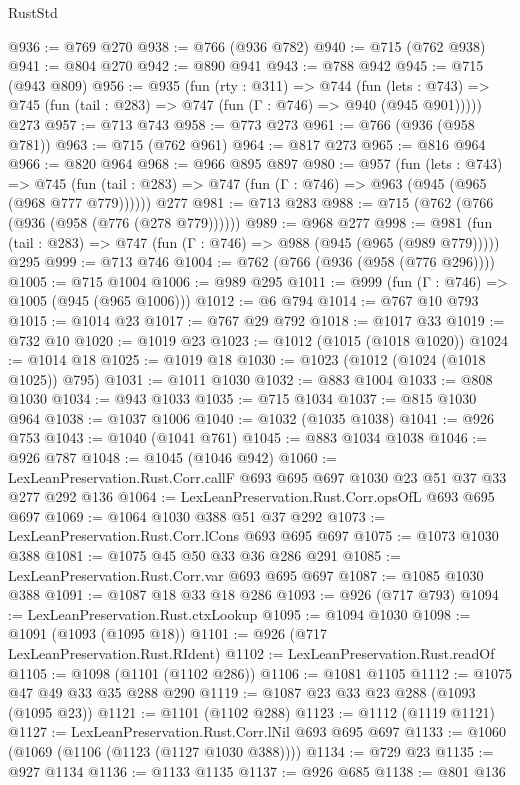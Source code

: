 \begin{lexlean}{RustStd}
\begin{coremodule}
{\begin{coremodule}
{{{{{{{{@936 := @769 @270
@938 := @766 (@936 @782)
@940 := @715 (@762 @938)
@941 := @804 @270
@942 := @890 @941
@943 := @788 @942
@945 := @715 (@943 @809)
@956 := @935
    (fun (rty : @311) =>
    @744
      (fun (lets : @743) => @745 (fun (tail : @283) => @747 (fun (Γ : @746) => @940 (@945 @901)))))
    @273
@957 := @713 @743
@958 := @773 @273
@961 := @766 (@936 (@958 @781))
@963 := @715 (@762 @961)
@964 := @817 @273
@965 := @816 @964
@966 := @820 @964
@968 := @966 @895 @897
@980 := @957
    (fun (lets : @743) =>
    @745 (fun (tail : @283) => @747 (fun (Γ : @746) => @963 (@945 (@965 (@968 @777 @779))))))
    @277
@981 := @713 @283
@988 := @715 (@762 (@766 (@936 (@958 (@776 (@278 @779))))))
@989 := @968 @277
@998 := @981 (fun (tail : @283) => @747 (fun (Γ : @746) => @988 (@945 (@965 (@989 @779))))) @295
@999 := @713 @746
@1004 := @762 (@766 (@936 (@958 (@776 @296))))
@1005 := @715 @1004
@1006 := @989 @295
@1011 := @999 (fun (Γ : @746) => @1005 (@945 (@965 @1006)))
@1012 := @6 @794
@1014 := @767 @10 @793
@1015 := @1014 @23
@1017 := @767 @29 @792
@1018 := @1017 @33
@1019 := @732 @10
@1020 := @1019 @23
@1023 := @1012 (@1015 (@1018 @1020))
@1024 := @1014 @18
@1025 := @1019 @18
@1030 := @1023 (@1012 (@1024 (@1018 @1025)) @795)
@1031 := @1011 @1030
@1032 := @883 @1004
@1033 := @808 @1030
@1034 := @943 @1033
@1035 := @715 @1034
@1037 := @815 @1030 @964
@1038 := @1037 @1006
@1040 := @1032 (@1035 @1038)
@1041 := @926 @753
@1043 := @1040 (@1041 @761)
@1045 := @883 @1034 @1038
@1046 := @926 @787
@1048 := @1045 (@1046 @942)
@1060 := LexLeanPreservation.Rust.Corr.callF @693 @695 @697 @1030 @23 @51 @37 @33 @277 @292 @136
@1064 := LexLeanPreservation.Rust.Corr.opsOfL @693 @695 @697
@1069 := @1064 @1030 @388 @51 @37 @292
@1073 := LexLeanPreservation.Rust.Corr.lCons @693 @695 @697
@1075 := @1073 @1030 @388
@1081 := @1075 @45 @50 @33 @36 @286 @291
@1085 := LexLeanPreservation.Rust.Corr.var @693 @695 @697
@1087 := @1085 @1030 @388
@1091 := @1087 @18 @33 @18 @286
@1093 := @926 (@717 @793)
@1094 := LexLeanPreservation.Rust.ctxLookup
@1095 := @1094 @1030
@1098 := @1091 (@1093 (@1095 @18))
@1101 := @926 (@717 LexLeanPreservation.Rust.RIdent)
@1102 := LexLeanPreservation.Rust.readOf
@1105 := @1098 (@1101 (@1102 @286))
@1106 := @1081 @1105
@1112 := @1075 @47 @49 @33 @35 @288 @290
@1119 := @1087 @23 @33 @23 @288 (@1093 (@1095 @23))
@1121 := @1101 (@1102 @288)
@1123 := @1112 (@1119 @1121)
@1127 := LexLeanPreservation.Rust.Corr.lNil @693 @695 @697
@1133 := @1060 (@1069 (@1106 (@1123 (@1127 @1030 @388))))
@1134 := @729 @23
@1135 := @927 @1134
@1136 := @1133 @1135
@1137 := @926 @685
@1138 := @801 @136
}}}}}}}}
\end{coremodule}}
\end{coremodule}
\end{lexlean}
